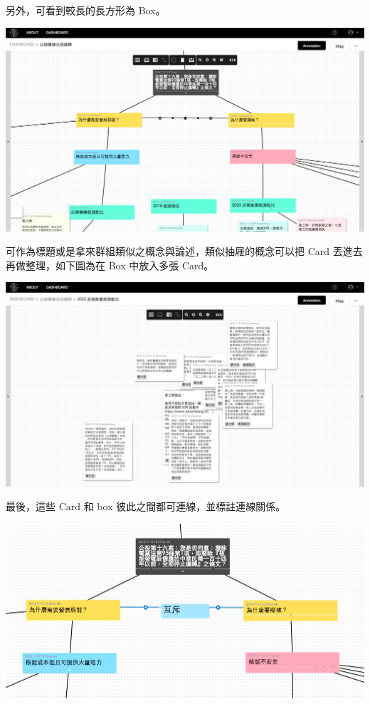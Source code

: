 \documentclass[12pt,a4paper]{article}
\begin{document}
\begin{enumerate}
\begin{enumerate}
\begin{enumerate}
另外，可看到較長的長方形為 Box。

\begin{center}
\includegraphics[width=.9\linewidth]{./images/nuclear_main_boxes.png}
\end{center}

可作為標題或是拿來群組類似之概念與論述，類似抽屜的概念可以把 Card 丟進去再做整理，如下圖為在 Box 中放入多張 Card。

\begin{center}
\includegraphics[width=.9\linewidth]{./images/nuclear_in_box.png}
\end{center}

最後，這些 Card 和 box 彼此之間都可連線，並標註連線關係。

\begin{center}
\includegraphics[width=.9\linewidth]{./images/nuclear_anti.png}
\end{center}


\end{enumerate}
\end{enumerate}
\end{enumerate}
\end{document}
